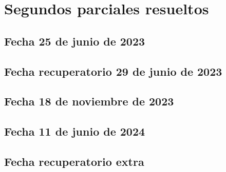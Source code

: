 \documentclass[10pt, a4paper]{report}
\begin{document}
        \newpage
    \chapter{Segundos parciales resueltos}
        \section{Fecha 25 de junio de 2023}
            



        \newpage
        \section{Fecha recuperatorio 29 de junio de 2023}
            



        \newpage
        \section{Fecha 18 de noviembre de 2023}
            



        \newpage
        \section{Fecha 11 de junio de 2024}
            
     
    
          
           
            
          
                  \newpage
        \section{Fecha recuperatorio extra}
            
    
 
\end{document}
